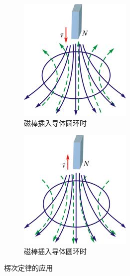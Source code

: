 \documentclass[12pt]{article}
\begin{document}
\begin{figure}[!h]
	\centering
	\begin{subfigure}{0.25\linewidth}
		\centering
		\includegraphics[width=0.9\linewidth]{graphics/楞次定律1.png}
		\caption{磁棒插入导体圆环时}
	\end{subfigure}
	\centering
	\begin{subfigure}{0.25\linewidth}
		\centering
		\includegraphics[width=0.9\linewidth]{graphics/楞次定律2.png}
		\caption{磁棒插入导体圆环时}
	\end{subfigure}
    \caption{楞次定律的应用}
\end{figure}
\end{document}
